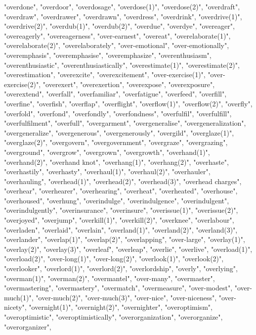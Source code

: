 "overdone",
"overdoor",
"overdosage",
"overdose(1)",
"overdose(2)",
"overdraft",
"overdraw",
"overdrawer",
"overdrawn",
"overdress",
"overdrink",
"overdrive(1)",
"overdrive(2)",
"overdub(1)",
"overdub(2)",
"overdue",
"overdye",
"overeager",
"overeagerly",
"overeagerness",
"over-earnest",
"overeat",
"overelaborate(1)",
"overelaborate(2)",
"overelaborately",
"over-emotional",
"over-emotionally",
"overemphasis",
"overemphasise",
"overemphasize",
"overenthusiasm",
"overenthusiastic",
"overenthusiastically",
"overestimate(1)",
"overestimate(2)",
"overestimation",
"overexcite",
"overexcitement",
"over-exercise(1)",
"over-exercise(2)",
"overexert",
"overexertion",
"overexpose",
"overexposure",
"overextend",
"overfall",
"overfamiliar",
"overfatigue",
"overfeed",
"overfill",
"overfine",
"overfish",
"overflap",
"overflight",
"overflow(1)",
"overflow(2)",
"overfly",
"overfold",
"overfond",
"overfondly",
"overfondness",
"overfulfil",
"overfulfill",
"overfulfilment",
"overfull",
"overgarment",
"overgeneralise",
"overgeneralization",
"overgeneralize",
"overgenerous",
"overgenerously",
"overgild",
"overglaze(1)",
"overglaze(2)",
"overgovern",
"overgovernment",
"overgraze",
"overgrazing",
"overground",
"overgrow",
"overgrown",
"overgrowth",
"overhand(1)",
"overhand(2)",
"overhand knot",
"overhang(1)",
"overhang(2)",
"overhaste",
"overhastily",
"overhasty",
"overhaul(1)",
"overhaul(2)",
"overhauler",
"overhauling",
"overhead(1)",
"overhead(2)",
"overhead(3)",
"overhead charges",
"overhear",
"overhearer",
"overhearing",
"overheat",
"overheated",
"overhouse",
"overhoused",
"overhung",
"overindulge",
"overindulgence",
"overindulgent",
"overindulgently",
"overinsurance",
"overinsure",
"overissue(1)",
"overissue(2)",
"overjoyed",
"overjump",
"overkill(1)",
"overkill(2)",
"overknee",
"overlabour",
"overladen",
"overlaid",
"overlain",
"overland(1)",
"overland(2)",
"overland(3)",
"overlander",
"overlap(1)",
"overlap(2)",
"overlapping",
"over-large",
"overlay(1)",
"overlay(2)",
"overlay(3)",
"overleaf",
"overleap",
"overlie",
"overlive",
"overload(1)",
"overload(2)",
"over-long(1)",
"over-long(2)",
"overlook(1)",
"overlook(2)",
"overlooker",
"overlord(1)",
"overlord(2)",
"overlordship",
"overly",
"overlying",
"overman(1)",
"overman(2)",
"overmantel",
"over-many",
"overmaster",
"overmastering",
"overmastery",
"overmatch",
"overmeasure",
"over-modest",
"over-much(1)",
"over-much(2)",
"over-much(3)",
"over-nice",
"over-niceness",
"over-nicety",
"overnight(1)",
"overnight(2)",
"overnighter",
"overoptimism",
"overoptimistic",
"overoptimistically",
"overorganization",
"overorganize",
"overorganizer",
